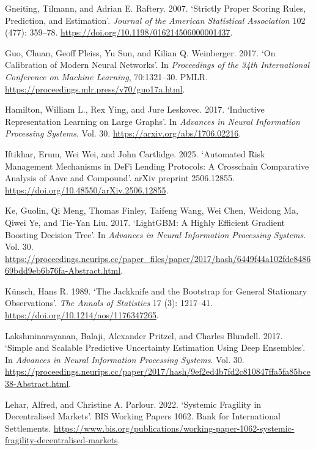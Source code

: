 \documentclass[
  10pt,
  a4paper,
]{article}
\newlength{\cslhangindent}
\newenvironment{CSLReferences}[2] %
 {\begin{list}{}{%
  \setlength{\itemindent}{0pt}
  \setlength{\leftmargin}{0pt}
  \setlength{\parsep}{0pt}
  \ifodd #1
   \setlength{\leftmargin}{\cslhangindent}
   \setlength{\itemindent}{-1\cslhangindent}
  \fi
  \setlength{\itemsep}{#2\baselineskip}}}
 {\end{list}}
\begin{document}
\begin{CSLReferences}{1}{0}
Gneiting, Tilmann, and Adrian E. Raftery. 2007. {`Strictly Proper
Scoring Rules, Prediction, and Estimation'}. \emph{Journal of the
American Statistical Association} 102 (477): 359--78.
\url{https://doi.org/10.1198/016214506000001437}.

Guo, Chuan, Geoff Pleiss, Yu Sun, and Kilian Q. Weinberger. 2017. {`On
Calibration of Modern Neural Networks'}. In \emph{Proceedings of the
34th International Conference on Machine Learning}, 70:1321--30. PMLR.
\url{https://proceedings.mlr.press/v70/guo17a.html}.

Hamilton, William L., Rex Ying, and Jure Leskovec. 2017. {`Inductive
Representation Learning on Large Graphs'}. In \emph{Advances in Neural
Information Processing Systems}. Vol. 30.
\url{https://arxiv.org/abs/1706.02216}.

Iftikhar, Erum, Wei Wei, and John Cartlidge. 2025. {`Automated Risk
Management Mechanisms in {DeFi} Lending Protocols: A Crosschain
Comparative Analysis of Aave and Compound'}. arXiv preprint 2506.12855.
\url{https://doi.org/10.48550/arXiv.2506.12855}.

Ke, Guolin, Qi Meng, Thomas Finley, Taifeng Wang, Wei Chen, Weidong Ma,
Qiwei Ye, and Tie-Yan Liu. 2017. {`{LightGBM}: A Highly Efficient
Gradient Boosting Decision Tree'}. In \emph{Advances in Neural
Information Processing Systems}. Vol. 30.
\url{https://proceedings.neurips.cc/paper_files/paper/2017/hash/6449f44a102fde848669bdd9eb6b76fa-Abstract.html}.

Künsch, Hans R. 1989. {`The Jackknife and the Bootstrap for General
Stationary Observations'}. \emph{The Annals of Statistics} 17 (3):
1217--41. \url{https://doi.org/10.1214/aos/1176347265}.

Lakshminarayanan, Balaji, Alexander Pritzel, and Charles Blundell. 2017.
{`Simple and Scalable Predictive Uncertainty Estimation Using Deep
Ensembles'}. In \emph{Advances in Neural Information Processing
Systems}. Vol. 30.
\url{https://proceedings.neurips.cc/paper/2017/hash/9ef2ed4b7fd2c810847ffa5fa85bce38-Abstract.html}.

Lehar, Alfred, and Christine A. Parlour. 2022. {`Systemic Fragility in
Decentralised Markets'}. BIS Working Papers 1062. Bank for International
Settlements.
\url{https://www.bis.org/publications/working-paper-1062-systemic-fragility-decentralised-markets}.


\end{CSLReferences}
\end{document}
